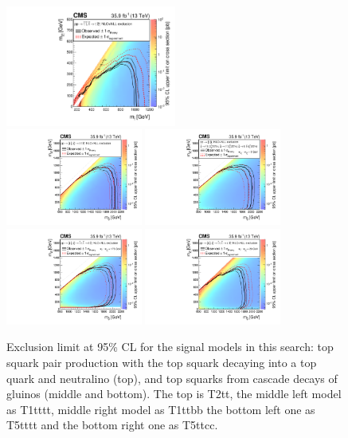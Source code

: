 \begin{figure}[ht!]
 \begin{centering}
  \includegraphics[width=0.50\textwidth]{sections/mc4/Results/figures/Covered_T2tt_OnlyXSEC.pdf}\\
  \includegraphics[width=0.40\textwidth]{sections/mc4/Results/figures/T1tttt_OnlyXSEC.pdf}
  \includegraphics[width=0.40\textwidth]{sections/mc4/Results/figures/T1ttbb_OnlyXSEC.pdf}\\
  \includegraphics[width=0.40\textwidth]{sections/mc4/Results/figures/T5ttttdM175_OnlyXSEC.pdf}
  \includegraphics[width=0.40\textwidth]{sections/mc4/Results/figures/T5ttcc_OnlyXSEC.pdf}\\
  \caption{Exclusion limit at 95\% CL for the signal models in this search: top squark pair production with the top squark decaying into a top quark and neutralino (top), and top squarks from cascade decays of gluinos (middle and bottom). The top is T2tt, the middle left model as T1tttt, middle right model as T1ttbb the bottom left one as T5tttt and the bottom right one as T5ttcc.}
  \label{fig:signal_results}
 \end{centering}
\end{figure}

